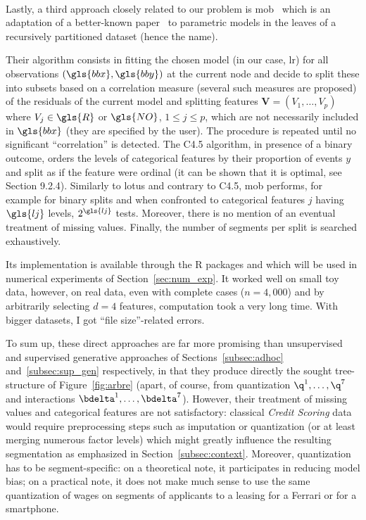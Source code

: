 \paragraph{} \label{par:mob}

Lastly, a third approach closely related to our problem is \gls{mob}~\cite{zeileis2008model} which is an adaptation of a better-known paper~\cite{hothorn2006unbiased} to parametric models in the leaves of a recursively partitioned dataset (hence the name).

Their algorithm consists in fitting the chosen model (in our case, \gls{lr}) for all observations $(\gls{bbx},\gls{bby})$ at the current node and decide to split these into subsets based on a correlation measure (several such measures are proposed) of the residuals of the current model and splitting features $\bm{V} = (V_1, \dots, V_p)$ where $V_j \in \gls{R}$ or $\gls{NO}$, $1 \leq j \leq p$, which are not necessarily included in $\gls{bbx}$ (they are specified by the user). The procedure is repeated until no significant ``correlation'' is detected. The C4.5 algorithm, in presence of a binary outcome, orders the levels of categorical features by their proportion of events $y$ and split as if the feature were ordinal (it can be shown that it is optimal, see~\cite{friedman2001elements} Section 9.2.4).  Similarly to \gls{lotus} and contrary to C4.5, \gls{mob} performs, for example for binary splits and when confronted to categorical features $j$ having $\gls{lj}$ levels, $2^{\gls{lj}}$ tests. Moreover, there is no mention of an eventual treatment of missing values. Finally, the number of segments per split is searched exhaustively.

Its implementation is available through the \textsf{R} packages  and  which will be used in numerical experiments of Section~\ref{sec:num_exp}. It worked well on small toy data, however, on real data, even with complete cases ($n = 4{,}000$) and by arbitrarily selecting $d = 4$ features, computation took a very long time. With bigger datasets, I got ``file size''-related errors.

\medskip

To sum up, these direct approaches are far more promising than unsupervised and supervised generative approaches of Sections~\ref{subsec:adhoc} and~\ref{subsec:sup_gen} respectively, in that they produce directly the sought tree-structure of Figure~\ref{fig:arbre} (apart, of course, from quantization $\q^1, \dots, \q^7$ and interactions $\bdelta^1, \dots, \bdelta^7$). However, their treatment of missing values and categorical features are not satisfactory: classical \textit{Credit Scoring} data would require preprocessing steps such as imputation or quantization (or at least merging numerous factor levels) which might greatly influence the resulting segmentation as emphasized in Section~\ref{subsec:context}. Moreover, quantization has to be segment-specific: on a theoretical note, it participates in reducing model bias; on a practical note, it does not make much sense to use the same quantization of wages on segments of applicants to a leasing for a Ferrari or for a smartphone.

